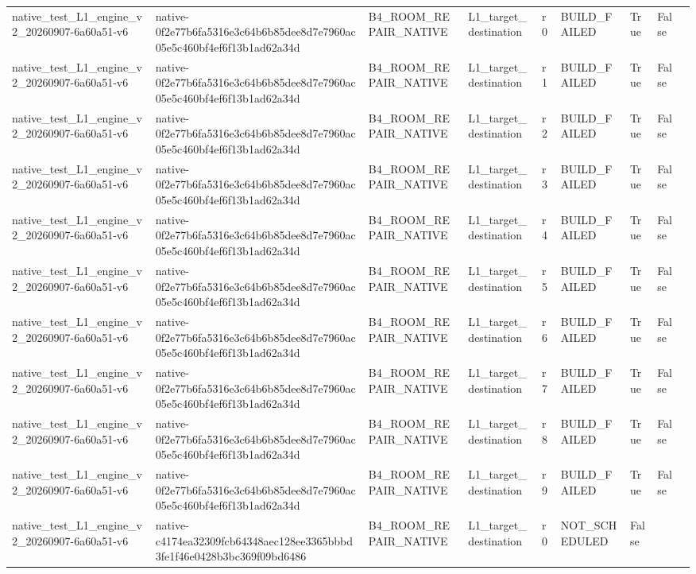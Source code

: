 \begin{tabular}{lllllllll}
native\_test\_L1\_engine\_v2\_20260907-6a60a51-v6 & native-0f2e77b6fa5316e3c64b6b85dee8d7e7960ac05e5c460bf4ef6f13b1ad62a34d & B4\_ROOM\_REPAIR\_NATIVE & L1\_target\_destination & r0 & BUILD\_FAILED & True & False &  \\
native\_test\_L1\_engine\_v2\_20260907-6a60a51-v6 & native-0f2e77b6fa5316e3c64b6b85dee8d7e7960ac05e5c460bf4ef6f13b1ad62a34d & B4\_ROOM\_REPAIR\_NATIVE & L1\_target\_destination & r1 & BUILD\_FAILED & True & False &  \\
native\_test\_L1\_engine\_v2\_20260907-6a60a51-v6 & native-0f2e77b6fa5316e3c64b6b85dee8d7e7960ac05e5c460bf4ef6f13b1ad62a34d & B4\_ROOM\_REPAIR\_NATIVE & L1\_target\_destination & r2 & BUILD\_FAILED & True & False &  \\
native\_test\_L1\_engine\_v2\_20260907-6a60a51-v6 & native-0f2e77b6fa5316e3c64b6b85dee8d7e7960ac05e5c460bf4ef6f13b1ad62a34d & B4\_ROOM\_REPAIR\_NATIVE & L1\_target\_destination & r3 & BUILD\_FAILED & True & False &  \\
native\_test\_L1\_engine\_v2\_20260907-6a60a51-v6 & native-0f2e77b6fa5316e3c64b6b85dee8d7e7960ac05e5c460bf4ef6f13b1ad62a34d & B4\_ROOM\_REPAIR\_NATIVE & L1\_target\_destination & r4 & BUILD\_FAILED & True & False &  \\
native\_test\_L1\_engine\_v2\_20260907-6a60a51-v6 & native-0f2e77b6fa5316e3c64b6b85dee8d7e7960ac05e5c460bf4ef6f13b1ad62a34d & B4\_ROOM\_REPAIR\_NATIVE & L1\_target\_destination & r5 & BUILD\_FAILED & True & False &  \\
native\_test\_L1\_engine\_v2\_20260907-6a60a51-v6 & native-0f2e77b6fa5316e3c64b6b85dee8d7e7960ac05e5c460bf4ef6f13b1ad62a34d & B4\_ROOM\_REPAIR\_NATIVE & L1\_target\_destination & r6 & BUILD\_FAILED & True & False &  \\
native\_test\_L1\_engine\_v2\_20260907-6a60a51-v6 & native-0f2e77b6fa5316e3c64b6b85dee8d7e7960ac05e5c460bf4ef6f13b1ad62a34d & B4\_ROOM\_REPAIR\_NATIVE & L1\_target\_destination & r7 & BUILD\_FAILED & True & False &  \\
native\_test\_L1\_engine\_v2\_20260907-6a60a51-v6 & native-0f2e77b6fa5316e3c64b6b85dee8d7e7960ac05e5c460bf4ef6f13b1ad62a34d & B4\_ROOM\_REPAIR\_NATIVE & L1\_target\_destination & r8 & BUILD\_FAILED & True & False &  \\
native\_test\_L1\_engine\_v2\_20260907-6a60a51-v6 & native-0f2e77b6fa5316e3c64b6b85dee8d7e7960ac05e5c460bf4ef6f13b1ad62a34d & B4\_ROOM\_REPAIR\_NATIVE & L1\_target\_destination & r9 & BUILD\_FAILED & True & False &  \\
native\_test\_L1\_engine\_v2\_20260907-6a60a51-v6 & native-c4174ea32309fcb64348aec128ee3365bbbd3fe1f46e0428b3bc369f09bd6486 & B4\_ROOM\_REPAIR\_NATIVE & L1\_target\_destination & r0 & NOT\_SCHEDULED & False &  &  \\

\end{tabular}
